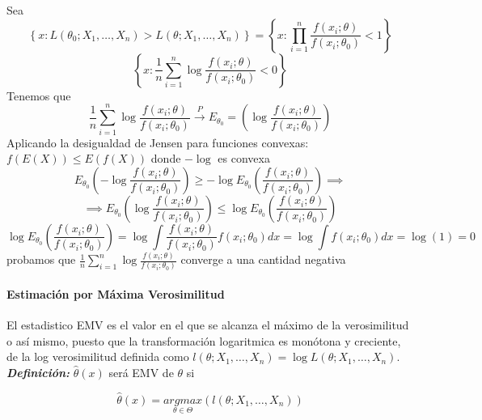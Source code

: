 \begin{proofs}
    Sea
    \[
        \left\{x:L(\theta_0;X_1,\dots,X_n)>L(\theta;X_1,\dots,X_n)\right\}=\left\{x:\prod_{i=1}^{n}\frac{f(x_i;\theta)}{f(x_i;\theta_0)}<1\right\}
    \]
    \[
        \left\{x:\frac{1}{n}\sum_{i=1}^{n}\log{\frac{f(x_i;\theta)}{f(x_i;\theta_0)}}<0\right\}
    \]
    Tenemos que
    \[
        \frac{1}{n}\sum_{i=1}^{n}\log{\frac{f(x_i;\theta)}{f(x_i;\theta_0)}} \overset{P}{\to}E_{\theta_0}=\left(\log{\frac{f(x_i;\theta)}{f(x_i;\theta_0)}}\right)
    \]
    Aplicando la desigualdad de Jensen para funciones convexas: $f(E(X)) \leq E(f(X))$ donde $-\log$ es convexa
    \[
        E_{\theta_0}\left(-\log{\frac{f(x_i;\theta)}{f(x_i;\theta_0)}}\right) \geq -\log{E_{\theta_0}\left(\frac{f(x_i;\theta)}{f(x_i;\theta_0)}\right)} \implies
    \]
    \[
        \implies E_{\theta_0}\left(\log{\frac{f(x_i;\theta)}{f(x_i;\theta_0)}}\right) \leq \log{E_{\theta_0}\left(\frac{f(x_i;\theta)}{f(x_i;\theta_0)}\right)}
    \]
    \[
        \log{E_{\theta_0}\left(\frac{f(x_i;\theta)}{f(x_i;\theta_0)}\right)}=\log\int\frac{f(x_i;\theta)}{f(x_i;\theta_0)}f(x_i;\theta_0)dx=\log\int f(x_i;\theta_0)dx=\log(1)=0
    \]
    probamos que $\frac{1}{n}\sum_{i=1}^{n}\log{\frac{f(x_i;\theta)}{f(x_i;\theta_0)}}$ converge a una cantidad negativa
\end{proofs}

\newpage

\paragraph{Estimación por Máxima Verosimilitud}

El estadistico EMV es el valor en el que se alcanza el máximo de la verosimilitud o así mismo, puesto que la transformación logaritmica es monótona y creciente, de la log verosimilitud definida como $l(\theta;X_1,\dots,X_n)=\log L(\theta;X_1,\dots,X_n)$. \\

\textbf{\textit{Definición: }} $\widehat{\theta}(x)$ será EMV de $\theta$ si

\[
    \widehat{\theta}(x) = \underset{\theta \in \Theta}{argmax}(l(\theta;X_1,\dots,X_n))
\]

